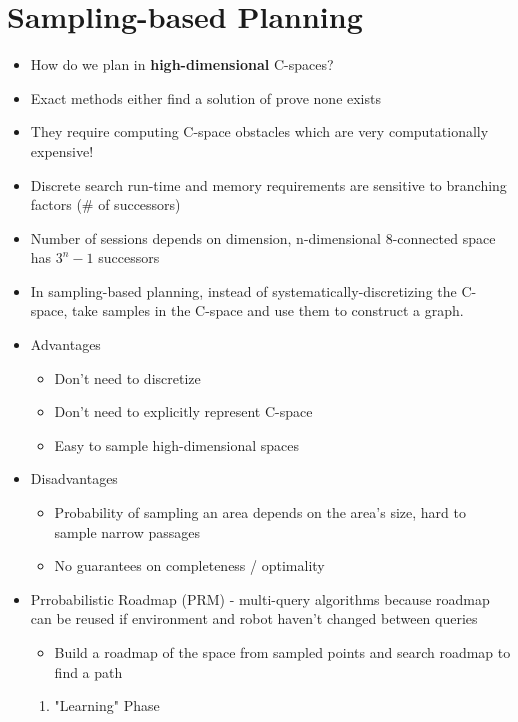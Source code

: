 \documentclass[../main.tex]{subfiles}
\begin{document}
    \section{Sampling-based Planning}
    \begin{itemize}
        \item How do we plan in \textbf{high-dimensional} C-spaces?
        \item Exact methods either find a solution of prove none exists
        \item They require computing C-space obstacles which are very computationally expensive!
        \item Discrete search run-time and memory requirements are sensitive to branching factors (\# of successors)
        \item Number of sessions depends on dimension, n-dimensional 8-connected space has $3^{n} - 1$ successors
        \item In sampling-based planning, instead of systematically-discretizing the C-space, take samples in the C-space and use them to construct a graph.
        \item Advantages
        \begin{itemize}
            \item Don't need to discretize
            \item Don't need to explicitly represent C-space
            \item Easy to sample high-dimensional spaces
        \end{itemize}
        \item Disadvantages
        \begin{itemize}
            \item Probability of sampling an area depends on the area's size, hard to sample narrow passages
            \item No guarantees on completeness / optimality
        \end{itemize}
        \item Prrobabilistic Roadmap (PRM) - multi-query algorithms because roadmap can be reused if environment and robot haven't changed between queries
        \begin{itemize}
            \item Build a roadmap of the space from sampled points and search roadmap to find a path
        \end{itemize}
        \begin{enumerate}
            \item "Learning" Phase

\end{enumerate}
\end{itemize}
\end{document}
